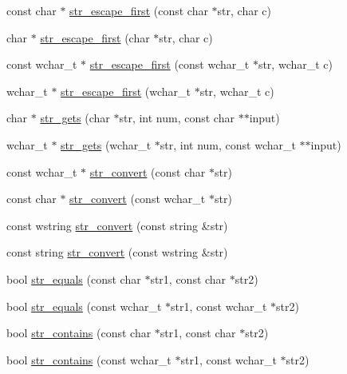 \begin{DoxyCompactItemize}
\item 
const char $\ast$ \hyperlink{namespacemage_a451f2cac5de5cebbe8bc004b3f29857b}{str\+\_\+escape\+\_\+first} (const char $\ast$str, char c)
\item 
char $\ast$ \hyperlink{namespacemage_a7a7fa3e9439ddbe1f31fe888a2a70e3d}{str\+\_\+escape\+\_\+first} (char $\ast$str, char c)
\item 
const wchar\+\_\+t $\ast$ \hyperlink{namespacemage_ac47b9d026e0ddda47b3d889beb40a2d9}{str\+\_\+escape\+\_\+first} (const wchar\+\_\+t $\ast$str, wchar\+\_\+t c)
\item 
wchar\+\_\+t $\ast$ \hyperlink{namespacemage_a8fbccb44f38a2e8b09baf805e9f34fc1}{str\+\_\+escape\+\_\+first} (wchar\+\_\+t $\ast$str, wchar\+\_\+t c)
\item 
char $\ast$ \hyperlink{namespacemage_ab7f63cc8e67ba97382747bc75fd75f62}{str\+\_\+gets} (char $\ast$str, int num, const char $\ast$$\ast$input)
\item 
wchar\+\_\+t $\ast$ \hyperlink{namespacemage_a881ab89db7712612531d47a64c6dfaa1}{str\+\_\+gets} (wchar\+\_\+t $\ast$str, int num, const wchar\+\_\+t $\ast$$\ast$input)
\item 
const wchar\+\_\+t $\ast$ \hyperlink{namespacemage_aba19c96528a59194ebc100244518f608}{str\+\_\+convert} (const char $\ast$str)
\item 
const char $\ast$ \hyperlink{namespacemage_a93f0e3b596ce1156d1fce19967fc316a}{str\+\_\+convert} (const wchar\+\_\+t $\ast$str)
\item 
const wstring \hyperlink{namespacemage_a9a7ff7b35c293ad8f09d5603f78e4c52}{str\+\_\+convert} (const string \&str)
\item 
const string \hyperlink{namespacemage_a5425aab167b483cdf05a6aaf0d074ed1}{str\+\_\+convert} (const wstring \&str)
\item 
bool \hyperlink{namespacemage_a4f78f15f269c1f65d4148983bc8224c5}{str\+\_\+equals} (const char $\ast$str1, const char $\ast$str2)
\item 
bool \hyperlink{namespacemage_a0013423e891bc8f522248a6a3f826681}{str\+\_\+equals} (const wchar\+\_\+t $\ast$str1, const wchar\+\_\+t $\ast$str2)
\item 
bool \hyperlink{namespacemage_a5194c40ccd591a8a8926ad7812abcd09}{str\+\_\+contains} (const char $\ast$str1, const char $\ast$str2)
\item 
bool \hyperlink{namespacemage_aac9609117e428765417683338ae8fa73}{str\+\_\+contains} (const wchar\+\_\+t $\ast$str1, const wchar\+\_\+t $\ast$str2)
\item 

\end{DoxyCompactItemize}
